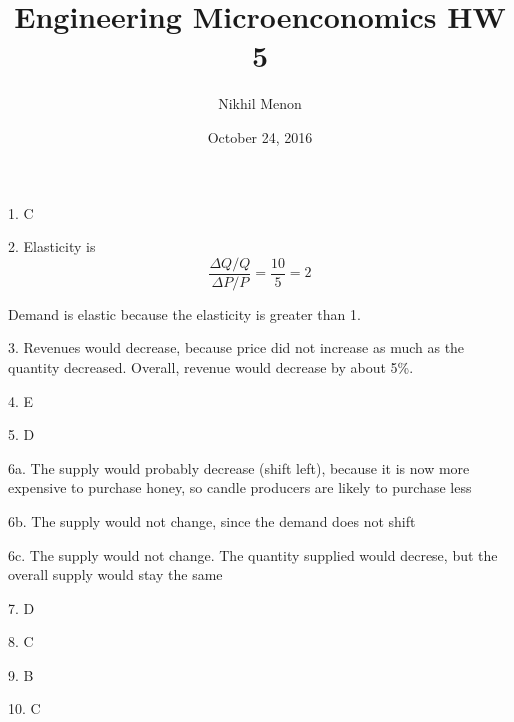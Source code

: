 \documentclass{article}
\title{Engineering Microenconomics HW 5}
\author{Nikhil Menon}
\date{October 24, 2016}
\begin{document}
\maketitle

1. C

2.  Elasticity is
$$\frac{\Delta Q/Q}{\Delta P/P}=\frac{10}{5}=2$$

Demand is elastic because the elasticity is greater than 1.

3.  Revenues would decrease, because price did not increase as much as the quantity decreased. Overall, revenue would decrease by about 5\%.

4. E

5. D

6a. The supply would probably decrease (shift left), because it is now more expensive to purchase honey, so candle producers are likely to purchase less 

6b. The supply would not change, since the demand does not shift

6c. The supply would not change. The quantity supplied would decrese, but the overall supply would stay the same

7. D

8. C

9. B

10. C
\end{document}
